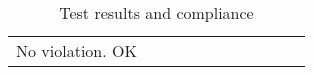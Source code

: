 \begin{table}[h!]
\begin{tabular}{|c|c|c|c|c|c|c|c|c|c|c|}
No violation.
OK
  \end{tabular}
  \caption{Test results and compliance}
  
  \end{table}
  